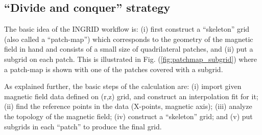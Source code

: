 \subsection{\label{sec:level2} ``Divide and conquer'' strategy}

The basic idea of the INGRID workflow is: (i) first construct a
``skeleton'' grid (also called a ``patch-map'') which corresponds to
the geometry of the magnetic field in hand and consists of a small
size of quadrilateral patches, and (ii) put a subgrid on each
patch. This is illustrated in Fig. (\ref{fig:patchmap_subgrid}) where
a patch-map is shown with one of the patches covered with a subgrid.

As explained further, the basic steps of the calculation are: (i)
import given magnetic field data defined on (r,z) grid, and construct
an interpolation fit for it; (ii) find the reference points in the
data (X-points, magnetic axis); (iii) analyze the topology of the
magnetic field; (iv) construct a ``skeleton'' grid; and (v) put
subgrids in each ``patch'' to produce the final grid.
